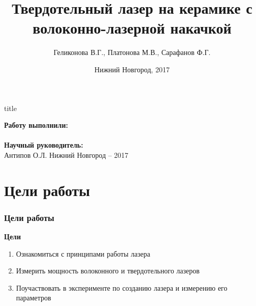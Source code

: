 \documentclass[10pt,pdf,hyperref={unicode}, dvipsnames]{beamer}
\title[]{Твердотельный лазер на керамике с волоконно-лазерной накачкой}
\author{%
	Геликонова В.Г., %
	Платонова М.В., %
	Сарафанов Ф.Г. %
}
\institute{Радиофизический факультет ННГУ, 420 группа}
\date{Нижний Новгород, 2017}
\begin{document}
  

\begin{frame}[plain]
	\centering
	\vspace{2cm}
	\begin{beamercolorbox}[sep=8pt,center]{title}
		\bf{}\inserttitle
	\end{beamercolorbox}
	\vspace{0.5cm}
	\normalsize \textbf{Работу выполнили:}\\
	\large\insertauthor\\ 
	\vspace{0.5cm}
	\normalsize{\textbf{Научный руководитель:}\\}
	\large{Антипов О.Л.}
	\vfill
	\small{Нижний Новгород -- 2017}
\end{frame}
\section{Цели работы}
\begin{frame}[t]
	\frametitle{Цели работы}
	\textbf{Цели}\\
	\begin{enumerate}
		\item Ознакомиться с принципами работы  лазера
		\item Измерить мощность волоконного и твердотельного лазеров
		\item Поучаствовать в эксперименте по созданию лазера и измерению его параметров	
	\end{enumerate}
\end{frame}
\end{document}
